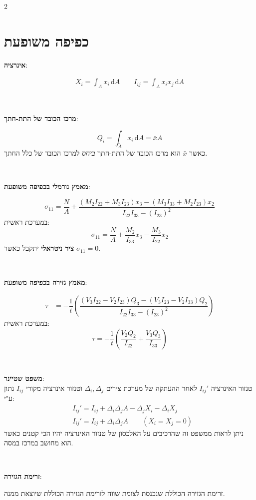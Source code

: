 \documentclass{article}
\newenvironment{cheatformula}[1][כותרת]{
    \begin{minipage}{\linewidth}
    \textbf{#1}:
}{
    \end{minipage}\\[2ex]
}
\begin{document}
\begin{multicols*}{2}
\section{כפיפה משופעת}
\begin{cheatformula}[אינרציה]
    \begin{gather*}
        X_{i} =\int _{A}x_{i} \, \mathrm{d}A\qquad
        I_{ij} =\int _{A} x_{i}x_{j} \, \mathrm{d}A
    \end{gather*}
\end{cheatformula}
\begin{cheatformula}[מרכז הכובד של התת-חתך]
       $$Q_{i}= \int _{\tilde{A}}x_{i} \, \mathrm{d}A=\bar{x}A$$
       כאשר $\bar{x}$ הוא מרכז הכובד של התת-חתך \textit{ביחס} למרכז הכובד של כלל החתך.
\end{cheatformula}
\begin{cheatformula}[מאמץ נורמלי בכפיפה משופעת]
    $$\sigma_{11}=\dfrac{N}{A}+\dfrac{({M}_{2} {I}_{22} +{M}_{3} {I}_{23} ){x}_{3} -({M}_{3} {I}_{33} +{M}_{2} {I}_{23} ){x}_{2} }{{I}_{22} {I}_{33} -({I}_{23})^{2} }$$
    במערכת ראשית:
    $$\sigma_{11}=\dfrac{N}{A}+\dfrac{{M}_{2}}{I_{33}}{x}_{3} -\dfrac{M_{3}}{I_{22}}{x}_{2} $$
    \textbf{ציר ניטראלי} יתקבל כאשר $\sigma_{11}=0$.
\end{cheatformula}
\begin{cheatformula}[מאמץ גזירה בכפיפה משופעת]
    \begin{align*}
        \tau & =-\dfrac{1}{t}\left( \dfrac{({V}_{3} {I}_{22} -V_{2}{I}_{23} ){Q}_{3} -({V}_{3} {I}_{23} -{V}_{2} {I}_{33} ){Q}_{2} }{{I}_{22} {I}_{33} -({I}_{23})^{2} } \right)
    \end{align*}
    במערכת ראשית:
    $$\tau=-\dfrac{1}{t}\left( \dfrac{{V}_{2} {Q}_{2} }{I_{22}}+\dfrac{{V}_{3} {Q}_{3} }{I_{33}} \right)$$
\end{cheatformula}
\begin{cheatformula}[משפט שטיינר]\\
    טנזור האינרציה $I_{ij}'$ לאחר ההעתקה של מערכת צירים $\Delta_{i},\Delta_{j}$ וטנזור אינרציה מקורי $I_{ij}$ נתון ע"י:
    \begin{align*}
        &I_{ij}'=I_{ij}+\Delta_{i}\Delta_{j}A-\Delta_{j}X_{i}-\Delta_{i}X_{j}\\
        &I_{ij}'=I_{ij}+\Delta _{i}\Delta _{j}A \qquad (X_i=X_j=0)
    \end{align*}
    ניתן לראות ממשפט זה שהרכיבים על האלכסון של טנזור האינרציה יהיו הכי קטנים כאשר הוא מחושב במרכז במסה.
\end{cheatformula}
\begin{cheatformula}[זרימת הגזירה]
    זרימת הגזירה הכוללת שנכנסת לצומת שווה לזרימת הגזירה הכוללת שיוצאת ממנה.
\end{cheatformula}


\end{multicols*}
\end{document}
